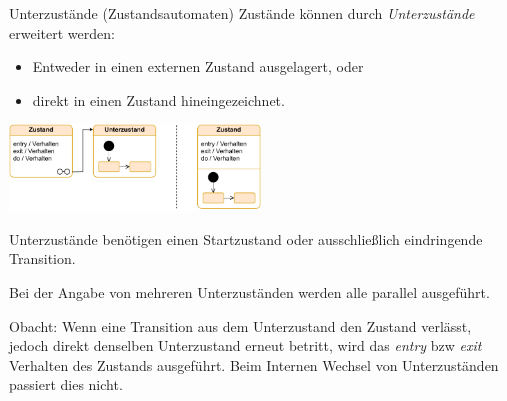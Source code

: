 \begin{diag}{Unterzustände (Zustandsautomaten)}
    Zustände können durch \emph{Unterzustände} erweitert werden:
    \begin{itemize}
        \item Entweder in einen externen Zustand ausgelagert, oder
        \item direkt in einen Zustand hineingezeichnet.
    \end{itemize}

    \begin{center}
        \includegraphics[width=0.5\textwidth]{includes/figures/defi_diagrams_state_substate.pdf}
    \end{center}

    Unterzustände benötigen einen Startzustand oder ausschließlich eindringende Transition.

    Bei der Angabe von mehreren Unterzuständen werden alle parallel ausgeführt.

    Obacht: Wenn eine Transition aus dem Unterzustand den Zustand verlässt, jedoch direkt denselben Unterzustand erneut betritt, wird das \emph{entry} bzw \emph{exit} Verhalten des Zustands ausgeführt.
    Beim Internen Wechsel von Unterzuständen passiert dies nicht.
\end{diag}

